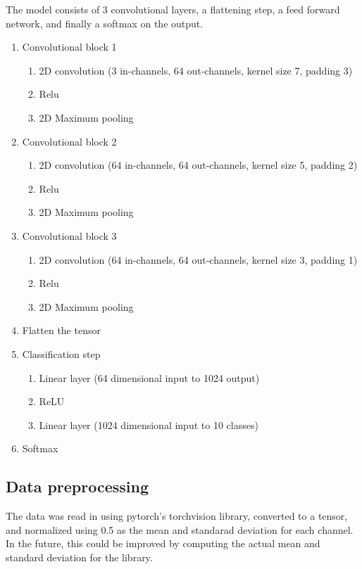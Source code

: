 \documentclass[letterpaper, 12pt]{article}
\begin{document}
The model consists of 3 convolutional layers, a flattening step, a feed forward network, and finally a softmax on the output.
\begin{enumerate}
\item Convolutional block 1
    \begin{enumerate}
    \item 2D convolution (3 in-channels, 64 out-channels, kernel size 7, padding 3)
    \item Relu
    \item 2D Maximum pooling
    \end{enumerate}
    
\item Convolutional block 2
    \begin{enumerate}
    \item 2D convolution (64 in-channels, 64 out-channels, kernel size 5, padding 2)
    \item Relu
    \item 2D Maximum pooling
    \end{enumerate}
    
\item Convolutional block 3
    \begin{enumerate}
    \item 2D convolution (64 in-channels, 64 out-channels, kernel size 3, padding 1)
    \item Relu
    \item 2D Maximum pooling
    \end{enumerate}
\item Flatten the tensor
\item Classification step
    \begin{enumerate}
     \item Linear layer (64 dimensional input to 1024 output)
     \item ReLU
     \item Linear layer (1024 dimensional input to 10 classes)
    \end{enumerate}
\item Softmax
\end{enumerate}

\subsection{Data preprocessing}
The data was read in using pytorch's torchvision library, converted to a tensor, and normalized using 0.5 as the mean and standarad deviation for each channel. In the future, this could be improved by computing the actual mean and standard deviation for the library.
\end{document}
